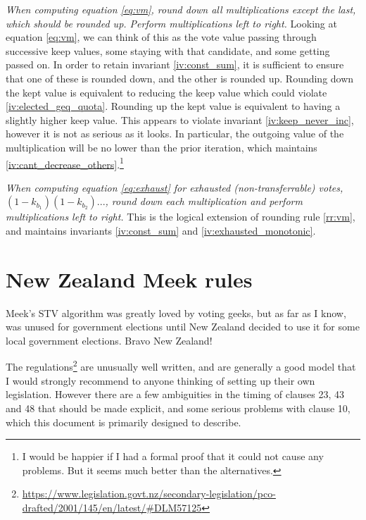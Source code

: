 \documentclass{article}
\begin{document}
\begin{roundingrule} \label{rr:vm}
    \emph{When computing equation \ref{eq:vm}, 
    round down all multiplications except the last, which should be rounded up.
    Perform multiplications left to right.}
    Looking at equation \ref{eq:vm}, we can think of this as the vote value passing
through successive keep values, some staying with that candidate, and some getting
passed on. In order to retain invariant \ref{iv:const_sum}, it is sufficient to 
ensure that one of these is rounded down, and the other is rounded up. Rounding down
the kept value is equivalent to reducing the keep value which could violate 
\ref{iv:elected_geq_quota}. Rounding up the kept value is equivalent to having a slightly
higher keep value. This appears to violate invariant \ref{iv:keep_never_inc}, however it
is not as serious as it looks. In particular, the outgoing value of the multiplication
will be no lower than the prior iteration, which maintains \ref{iv:cant_decrease_others}.\footnote{I would be happier if I had a formal proof that it could not cause any problems. But it seems much better than the alternatives.}
\end{roundingrule}

\begin{roundingrule}\label{rr:exhausted}
    \emph{When computing equation \ref{eq:exhaust} for exhausted (non-transferrable) votes,  
    $(1-k_{b_1})(1-k_{b_2})...$,
    round down each multiplication and perform multiplications left to right.}
    This is the logical extension of rounding rule \ref{rr:vm}, and maintains
    invariants \ref{iv:const_sum} and \ref{iv:exhausted_monotonic}.
\end{roundingrule}




\section{New Zealand Meek rules}

Meek's STV algorithm was greatly loved by voting geeks, but as far as I
know, was unused for government elections 
until New Zealand decided to use it for some local government
elections. Bravo New Zealand! 

The regulations\footnote{\href{https://www.legislation.govt.nz/secondary-legislation/pco-drafted/2001/145/en/latest/\#DLM57125}{https://www.legislation.govt.nz/secondary-legislation/pco-drafted/2001/145/en/latest/\#DLM57125}} are unusually well
written, and are generally a good model that I would strongly recommend to 
anyone thinking of setting up their own legislation. However there are a
few ambiguities in the timing of clauses 23, 43 and 48 that should be 
made explicit, and some serious problems with clause 10, which this document
is primarily designed to describe.
\end{document}
